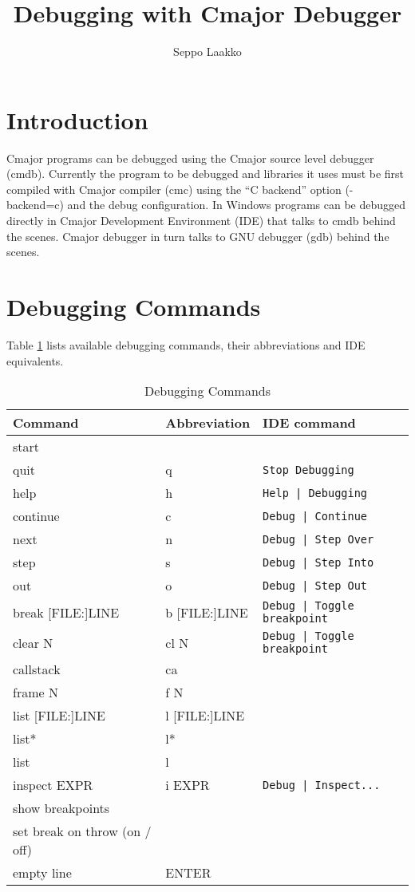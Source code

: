 \documentclass[oneside, a4paper, 11pt]{article}
\begin{document}
\title{Debugging with Cmajor Debugger}
\author{Seppo Laakko}
\maketitle

\section{Introduction}

Cmajor programs can be debugged using the Cmajor source level debugger (cmdb).
Currently the program to be debugged and libraries it uses must be first compiled with Cmajor compiler (cmc)
using the ``C backend'' option (-backend=c) and the debug configuration.
In Windows programs can be debugged directly in Cmajor Development Environment (IDE) that talks to cmdb behind the scenes.
Cmajor debugger in turn talks to GNU debugger (gdb) behind the scenes.

\section{Debugging Commands}

Table \ref{tab:commands} lists available debugging commands, their abbreviations and IDE equivalents.

\begin{table}[htb]
\caption{Debugging Commands}\label{tab:commands}
\begin{tabular}{lll}
\textbf{Command} & \textbf{Abbreviation} & \textbf{IDE command}\\
\hline
start & &\\
quit & q & \verb/Stop Debugging/\\
help & h & \verb/Help | Debugging/\\
continue & c & \verb/Debug | Continue/\\
next & n & \verb/Debug | Step Over/\\
step & s & \verb/Debug | Step Into/\\
out & o & \verb/Debug | Step Out/\\
break [FILE:]LINE & b [FILE:]LINE & \verb/Debug | Toggle breakpoint/\\
clear N & cl N & \verb/Debug | Toggle breakpoint/\\
callstack & ca\\
frame N & f N\\
list [FILE:]LINE & l [FILE:]LINE &\\
list* & l* &\\
list & l &\\
inspect EXPR & i EXPR& \verb/Debug | Inspect.../\\
show breakpoints\\
set break on throw (on / off)\\
empty line & ENTER\\
\end{tabular}
\end{table}
\end{document}
